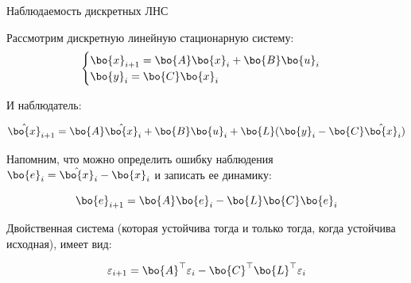 \documentclass{beamer}
\begin{document}
\begin{frame}{Наблюдаемость дискретных ЛНС}
	\begin{flushleft}
		
		Рассмотрим дискретную линейную стационарную систему:
		\begin{equation}
			\begin{cases}
				\bo{x}_{i+1} = \bo{A}  \bo{x}_i + \bo{B} \bo{u}_i \\
				\bo{y}_i     = \bo{C}  \bo{x}_i
			\end{cases}
		\end{equation}
		
		И наблюдатель:
		
		\begin{equation}
			\hat{\bo{x}}_{i+1} = \bo{A}  \hat{\bo{x}}_i + \bo{B} \bo{u}_i + 
			\bo{L} (\bo{y}_i - \bo{C} \hat{\bo{x}}_i)
		\end{equation}
		
		Напомним, что можно определить ошибку наблюдения $\bo{e}_i = \hat{\bo{x}}_i - \bo{x}_i$ и записать ее динамику:
		
		\begin{equation}
			\bo{e}_{i+1} = \bo{A} \bo{e}_i - 
			\bo{L} \bo{C} \bo{e}_i
		\end{equation}
		
		Двойственная система (которая устойчива тогда и только тогда, когда устойчива исходная), имеет вид:
		
		\begin{equation}
			\varepsilon_{i+1} = \bo{A}^\top \varepsilon_i - 
			\bo{C}^\top \bo{L}^\top \varepsilon_i
		\end{equation}
		
		
	\end{flushleft}
\end{frame}
\end{document}
